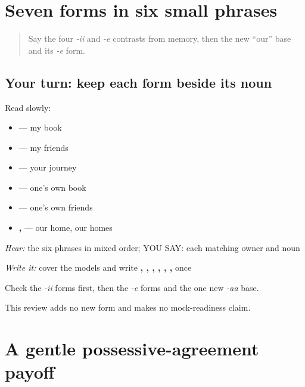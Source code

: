 \section[\texorpdfstring{\pa{ਮੇਰੀ}, \pa{ਮੇਰੇ}, \pa{ਤੁਹਾਡੀ} … (merii, mere …)}{ਮੇਰੀ, ਮੇਰੇ, ਤੁਹਾਡੀ … (merii, mere …)}]{Seven forms in six small phrases}

\label{lesson:PA-C185-possessive-review}



\begin{quote}
Say the four \emph{-ii} and \emph{-e} contrasts from memory, then the new “our” base and its \emph{-e} form.
\end{quote}

\subsection*{Your turn: keep each form beside its noun}
Read slowly:

\begin{itemize}
\raggedright
  \item \textbf{ } — my book
  \item \textbf{ } — my friends
  \item \textbf{ } — your journey
  \item \textbf{ } — one's own book
  \item \textbf{ } — one's own friends
  \item \textbf{ ,  } — our home, our homes
\end{itemize}

\emph{Hear:} the six phrases in mixed order; YOU SAY: each matching owner and noun

\begin{tcolorbox}[breakable,colback=teal!4,colframe=teal!35!black,title={Before you move on}]
\emph{Write it:} cover the models and write \textbf{, , , , , , } once

Check the \emph{-ii} forms first, then the \emph{-e} forms and the one new \emph{-aa} base.

This review adds no new form and makes no mock-readiness claim.
\end{tcolorbox}
\section[\texorpdfstring{\pa{ਮੇਰੀ} \pa{ਕਿਤਾਬ} … (merii kitaab …)}{ਮੇਰੀ ਕਿਤਾਬ … (merii kitaab …)}]{A gentle possessive-agreement payoff}

